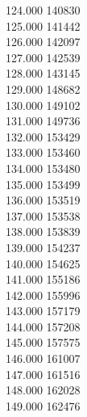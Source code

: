 { 124.000	140830 \\
 125.000	141442 \\
 126.000	142097 \\
 127.000	142539 \\
 128.000	143145 \\
 129.000	148682 \\
 130.000	149102 \\
 131.000	149736 \\
 132.000	153429 \\
 133.000	153460 \\
 134.000	153480 \\
 135.000	153499 \\
 136.000	153519 \\
 137.000	153538 \\
 138.000	153839 \\
 139.000	154237 \\
 140.000	154625 \\
 141.000	155186 \\
 142.000	155996 \\
 143.000	157179 \\
 144.000	157208 \\
 145.000	157575 \\
 146.000	161007 \\
 147.000	161516 \\
 148.000	162028 \\
 149.000	162476 \\
}
